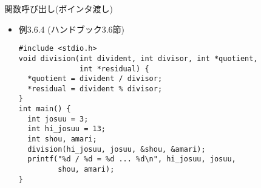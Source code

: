 \begin{frame}[t,fragile]{関数呼び出し(ポインタ渡し)}
  \begin{itemize}
    \setlength{\itemsep}{1em}
  \item 例3.6.4 (ハンドブック3.6節)
\begin{lstlisting}
#include <stdio.h>
void division(int divident, int divisor, int *quotient,
              int *residual) {
  *quotient = divident / divisor;
  *residual = divident % divisor;
}
int main() {
  int josuu = 3;
  int hi_josuu = 13;
  int shou, amari;
  division(hi_josuu, josuu, &shou, &amari);
  printf("%d / %d = %d ... %d\n", hi_josuu, josuu,
         shou, amari);
}
\end{lstlisting}
  \end{itemize}
\end{frame}
